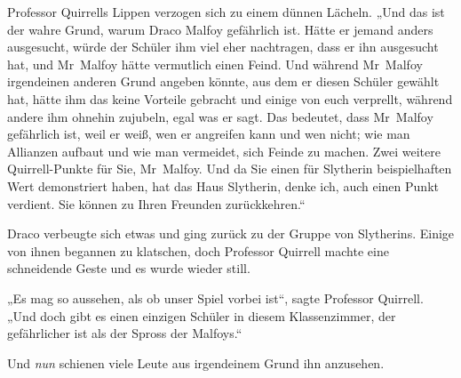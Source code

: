 Professor Quirrells Lippen verzogen sich zu einem dünnen Lächeln. „Und das ist der wahre Grund, warum Draco Malfoy gefährlich ist. Hätte er jemand anders ausgesucht, würde der Schüler ihm viel eher nachtragen, dass er ihn ausgesucht hat, und Mr~Malfoy hätte vermutlich einen Feind. Und während Mr~Malfoy irgendeinen anderen Grund angeben könnte, aus dem er diesen Schüler gewählt hat, hätte ihm das keine Vorteile gebracht und einige von euch verprellt, während andere ihm ohnehin zujubeln, egal was er sagt. Das bedeutet, dass Mr~Malfoy gefährlich ist, weil er weiß, wen er angreifen kann und wen nicht; wie man Allianzen aufbaut und wie man vermeidet, sich Feinde zu machen. Zwei weitere Quirrell-Punkte für Sie, Mr~Malfoy. Und da Sie einen für Slytherin beispielhaften Wert demonstriert haben, hat das Haus Slytherin, denke ich, auch einen Punkt verdient. Sie können zu Ihren Freunden zurückkehren.“

Draco verbeugte sich etwas und ging zurück zu der Gruppe von Slytherins. Einige von ihnen begannen zu klatschen, doch Professor Quirrell machte eine schneidende Geste und es wurde wieder still.

„Es mag so aussehen, als ob unser Spiel vorbei ist“, sagte Professor Quirrell. „Und doch gibt es einen einzigen Schüler in diesem Klassenzimmer, der gefährlicher ist als der Spross der Malfoys.“

Und \emph{nun} schienen viele Leute aus irgendeinem Grund ihn anzusehen.

